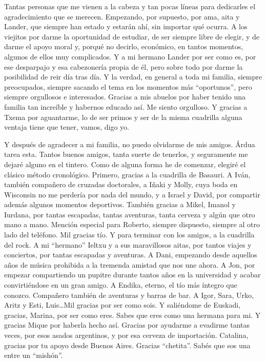 
\begin{acknowledgementslong} 

Tantas personas que me vienen a la cabeza y tan pocas líneas para dedicarles
el agradecimiento que se merecen. Empezando, por supuesto, por ama, aita y Lander,
que siempre han estado y estarán ahí, sin importar qué ocurra. A los viejitos
por darme la oportunidad de estudiar, de ser siempre libre de elegir, y de darme
el apoyo moral y, porqué no decirlo, económico, en tantos momentos, algunos de
ellos muy complicados. Y a mi hermano Lander por ser como es, por ese desparpajo
y esa cabezonería propia de él, pero sobre todo por darme la posibilidad de reir
día tras día. Y la verdad, en general a toda mi familia, siempre preocupados,
siempre sacando el tema en los momentos más ``oportunos'', pero siempre orgullosos
e interesados. Gracias a mis abuelos por haber tenido una familia tan increíble
y habernos educado así. Me siento orgulloso. Y gracias a Txema por aguantarme,
lo de ser primos y ser de la misma cuadrilla alguna ventaja tiene que tener,
vamos, digo yo.

Y después de agradecer a mi familia, no puedo olvidarme de mis amigos. Árdua
tarea esta. Tantos buenos amigos, tanta suerte de tenerlos, y seguramente me
dejaré alguno en el tintero. Como de alguna forma he de comenzar, elegiré el
clásico método cronológico. Primero, gracias a la cuadrilla de Basauri. A Iván,
también compañero de cruzadas doctorales, a Iñaki y Molly, cuya boda en Wisconsin
no me perdería por nada del mundo, y a Israel y David, por compartir además algunos
momentos deportivos. También gracias a Mikel, Imanol y Iurdana, por tantas
escapadas, tantas aventuras, tanta cerveza y algún que otro mano a mano. Mención
especial para Roberto, siempre dispuesto, siempre al otro lado del teléfono. Mil
gracias tío. Y para
terminar con los amigos, a la cuadrilla del rock. A mi ``hermano'' Ieltxu y a sus
maravillosos aitas, por tantos viajes y conciertos, por tantas escapadas y aventuras.
A Dani, empezando desde aquellos años de música prohibida a la tremenda amistad
que nos une ahora. A Jon, por empezar compartiendo un pupitre durante tantos años
en la universidad y acabar convirtiéndose en un gran amigo. A Endika, eterno, el
tío más íntegro que conozco. Compañero también de aventuras y barras de bar. A Igor,
Sara, Urko, Aritz y Esti, Luis\dots Mil gracias por ser como sois. Y saliéndome
de Euskadi, gracias, Marina, por ser como eres. Sabes que eres como una hermana
para mi. Y gracias Mique por haberla hecho así. Gracias por ayudarme a evadirme
tantas veces, por esos asados argentinos, y por esa cerveza de importación.
Catalina, gracias por tu apoyo desde Buenos Aires. Gracias ``chetita''. Sabés
que sos una entre un ``mishón''.


\end{acknowledgementslong}
